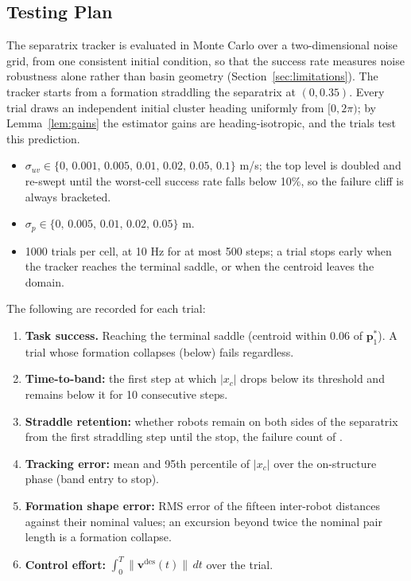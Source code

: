 \documentclass[lettersize,journal]{IEEEtran}
\begin{document}
\subsection{Testing Plan}
\label{sec:test_plan}

The separatrix tracker is evaluated in Monte Carlo over a two-dimensional
noise grid, from one consistent initial condition, so that the success
rate measures noise robustness alone rather than basin geometry
(Section~\ref{sec:limitations}). The tracker starts from a formation
straddling the separatrix at $(0, 0.35)$. Every trial draws an
independent initial cluster heading uniformly from $[0, 2\pi)$; by
Lemma~\ref{lem:gains} the estimator gains are heading-isotropic, and the
trials test this prediction.
\begin{itemize}
    \item $\sigma_{uv} \in \{0,\, 0.001,\, 0.005,\, 0.01,\, 0.02,\,
          0.05,\, 0.1\}$ m/s; the top level is doubled and re-swept
          until the worst-cell success rate falls below 10\%, so the
          failure cliff is always bracketed.
    \item $\sigma_p \in \{0,\, 0.005,\, 0.01,\, 0.02,\, 0.05\}$ m.
    \item 1000 trials per cell, at 10 Hz for at most 500 steps; a trial
          stops early when the tracker reaches the terminal saddle, or
          when the centroid leaves the domain.
\end{itemize}

The following are recorded for each trial:
\begin{enumerate}
    \item \textbf{Task success.} Reaching the terminal saddle (centroid
          within 0.06 of $\mathbf{p}^*_1$). A trial whose formation
          collapses (below) fails regardless.
    \item \textbf{Time-to-band:} the first step at which $|x_c|$ drops
          below its threshold and remains below it for 10 consecutive
          steps.
    \item \textbf{Straddle retention:} whether robots remain on both
          sides of the separatrix from the first straddling step until
          the stop, the failure count of \cite{9}.
    \item \textbf{Tracking error:} mean and 95th percentile of $|x_c|$
          over the on-structure phase (band entry to stop).
    \item \textbf{Formation shape error:} RMS error of the fifteen
          inter-robot distances against their nominal values; an
          excursion beyond twice the nominal pair length is a formation
          collapse.
    \item \textbf{Control effort:} $\int_0^T \|\mathbf{v}^{\text{des}}(t)\|
          \,dt$ over the trial.
\end{enumerate}
\end{document}
